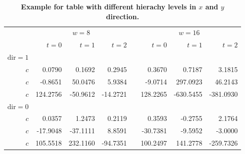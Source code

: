 \begin{table}
	
	\centering
	\caption{\textbf{Example for table with different hierachy levels in $x$ and $y$ direction.} \blindtext}
	\label{tab:table1}
	\vspace{5ex}
	\begin{tabular}{@{}rrrrcrrr@{}}\toprule
		& \multicolumn{3}{c}{$w = 8$} & \phantom{abc}& \multicolumn{3}{c}{$w = 16$} \\
		\cmidrule{2-4} \cmidrule{6-8}
		& $t=0$ & $t=1$ & $t=2$ && $t=0$ & $t=1$ & $t=2$\\ 
		\midrule
		$\mathrm{dir}=1$\\
		$c$ & 0.0790 & 0.1692 & 0.2945 && 0.3670 & 0.7187 & 3.1815 \\
		$c$ & -0.8651& 50.0476& 5.9384&& -9.0714& 297.0923& 46.2143\\
		$c$ & 124.2756& -50.9612& -14.2721&& 128.2265& -630.5455& -381.0930\\
		$\mathrm{dir}=0$\\
		$c$ & 0.0357& 1.2473& 0.2119&& 0.3593& -0.2755& 2.1764\\
		$c$ & -17.9048& -37.1111& 8.8591&& -30.7381& -9.5952& -3.0000\\
		$c$ & 105.5518& 232.1160& -94.7351&& 100.2497& 141.2778& -259.7326\\
		\bottomrule
	\end{tabular}

\end{table}

